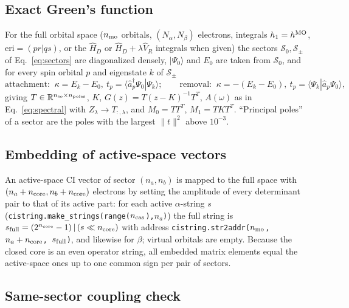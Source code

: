 \documentclass[11pt,a4paper]{article}
\newcommand{\ket}[1]{|#1\rangle}
\newcommand{\braket}[1]{\langle#1\rangle}
\newcommand{\code}[1]{\texttt{#1}}
\newcommand{\so}{\mathrm{so}}
\begin{document}
\subsection{Exact Green's function}

For the full orbital space ($n_{\rm mo}$ orbitals, $(N_\alpha,N_\beta)$
electrons, integrals $h_1=h^{\rm MO}$, $\mathrm{eri}=(pr|qs)$, or the
$\hat H_D$ or $\hat H_D+\lambda\hat V_R$ integrals when given) the sectors
$\mathcal S_0,\mathcal S_\pm$ of Eq.~\eqref{eq:sectors} are diagonalized
densely, $\ket{\Psi_0}$ and $E_0$ are taken from $\mathcal S_0$, and for
every spin orbital $p$ and eigenstate $k$ of $\mathcal S_\pm$
\begin{equation}
  \text{attachment: }\ \kappa=E_k-E_0,\ t_p=\braket{\hat a_p^\dagger\Psi_0|\Psi_k};\qquad
  \text{removal: }\ \kappa=-(E_k-E_0),\ t_p=\braket{\Psi_k|\hat a_p\Psi_0},
  \label{eq:fci-poles}
\end{equation}
giving $T\in\mathbb R^{n_{\so}\times n_{\rm poles}}$, $K$, $G(z)=T(z-K)^{-1}T^{T}$,
$A(\omega)$ as in Eq.~\eqref{eq:spectral} with $Z_\lambda\to T_{:,\lambda}$,
and $M_0=TT^{T}$, $M_1=TKT^{T}$.  ``Principal poles'' of a sector are the
poles with the largest $\|t\|^2$ above $10^{-3}$.

\subsection{Embedding of active-space vectors}

An active-space CI vector of sector $(n_a,n_b)$ is mapped to the full space
with $(n_a+n_{\rm core},n_b+n_{\rm core})$ electrons by setting the amplitude
of every determinant pair to that of its active part: for each active
$\alpha$-string $s$ (\code{cistring.make\_strings(range($n_{\rm cas}$),$n_a$)})
the full string is $s_{\rm full}=(2^{n_{\rm core}}-1)\,|\,(s\ll n_{\rm core})$
with address \code{cistring.str2addr($n_{\rm mo}$, $n_a+n_{\rm core}$, $s_{\rm full}$)},
and likewise for $\beta$; virtual orbitals are empty.  Because the closed
core is an even operator string, all embedded matrix elements equal the
active-space ones up to one common sign per pair of sectors.

\subsection{Same-sector coupling check}
\end{document}
